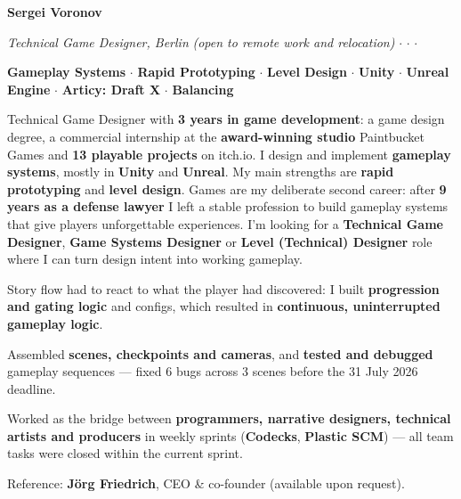 \documentclass[10pt]{article}
\begin{document}
{\LARGE\textbf{Sergei Voronov}}\hfill {}\par
\vspace{2pt}
{\large\itshape Technical Game Designer, Berlin} {\itshape (open to remote work and relocation)}\hfill
{} $\cdot$
 $\cdot$
 $\cdot$
\par
\vspace{4pt}
\textbf{Gameplay Systems} $\cdot$ \textbf{Rapid Prototyping} $\cdot$ \textbf{Level Design} $\cdot$ \textbf{Unity} $\cdot$ \textbf{Unreal Engine} $\cdot$ \textbf{Articy: Draft X} $\cdot$ \textbf{Balancing}\par

Technical Game Designer with \textbf{3 years in game development}: a game design degree, a commercial internship at the
\textbf{award-winning studio} Paintbucket Games and \textbf{13 playable projects} on itch.io. I design and implement
\textbf{gameplay systems}, mostly in \textbf{Unity} and \textbf{Unreal}. My main strengths are \textbf{rapid prototyping}
and \textbf{level design}. Games are my deliberate second career: after \textbf{9 years as a defense lawyer} I left a stable
profession to build gameplay systems that give players unforgettable experiences. I'm looking for a
\textbf{Technical Game Designer}, \textbf{Game Systems Designer} or \textbf{Level (Technical) Designer} role where I can
turn design intent into working gameplay.

\begin{points}
  \item Story flow had to react to what the player had discovered: I built \textbf{progression and gating logic} and
        configs, which resulted in \textbf{continuous, uninterrupted gameplay logic}.
  \item Assembled \textbf{scenes, checkpoints and cameras}, and \textbf{tested and debugged} gameplay sequences ---
        fixed 6 bugs across 3 scenes before the 31 July 2026 deadline.
  \item Worked as the bridge between \textbf{programmers, narrative designers, technical artists and producers} in weekly
        sprints (\textbf{Codecks}, \textbf{Plastic SCM}) --- all team tasks were closed within the current sprint.
  \item Reference: \textbf{Jörg Friedrich}, CEO \& co-founder (available upon request).
\end{points}
\end{document}
